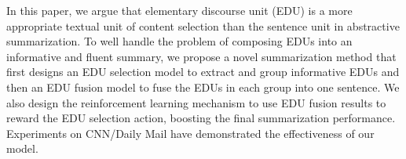 In this paper, we argue that elementary discourse unit (EDU) is a more appropriate textual unit of content selection than the sentence unit in abstractive summarization. To well handle the problem of composing EDUs into an informative and fluent summary, we propose a novel summarization method that first designs an EDU selection model to extract and group informative EDUs and then an EDU fusion model to fuse the EDUs in each group into one sentence.  We also design the reinforcement learning mechanism to use EDU fusion results to reward the EDU selection action, boosting the final summarization performance. Experiments on CNN/Daily Mail have demonstrated the effectiveness of our model.
